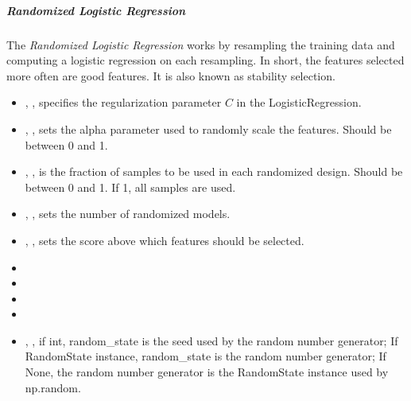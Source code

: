 \subparagraph{Randomized Logistic Regression}
\mbox{}

The \textit{Randomized Logistic Regression} works by resampling the training
data and computing a logistic regression on each resampling.
%
In short, the features selected more often are good features.
%
It is also known as stability selection.
%
\begin{itemize}
  \item {}, , specifies the
  regularization parameter $C$ in the LogisticRegression.
  \item {}, , sets
  the alpha parameter used to randomly scale
  the features.
  Should be between 0 and 1.
  \item {}, , is the
  fraction of samples to be used in each randomized design.
  Should be between 0 and 1.
  If 1, all samples are used.
  \item {}, , sets the number
  of randomized models.
  \item {}, , sets
  the score above which features should be selected.
  \item {}
  \item \verDescriptionB{}
  \item {}
  \item \tolDescriptionC{}
  \item {}, , if int, random\_state is the seed used by the random number
  generator; If RandomState instance, random\_state is the random
  number generator; If None, the random number generator is the RandomState
  instance used by np.random.
\end{itemize}

